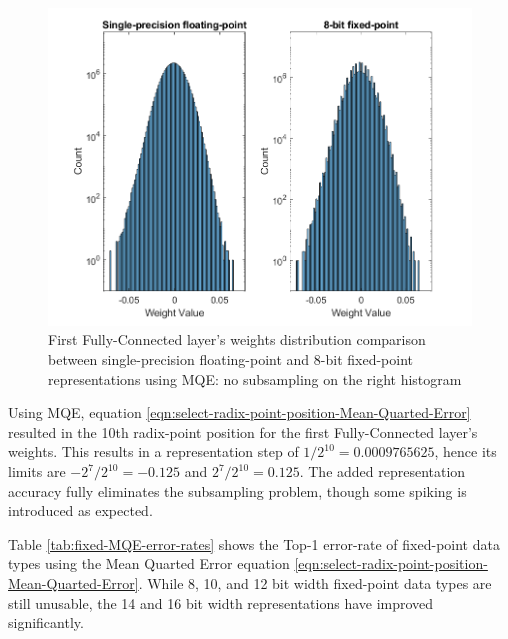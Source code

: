 \begin{figure} [H]
	\centering
	\includegraphics[scale=0.9]{Images/Weights-distributions/original-vs-fixed8/weight-distribution-FC1-MQE.png}
	\decoRule
	\caption[First Fully-Connected layer's weights distribution comparison between single-precision floating-point and 8-bit fixed-point representations using MQE]{First Fully-Connected layer's weights distribution comparison between single-precision floating-point and 8-bit fixed-point representations using MQE: no subsampling on the right histogram}
	\label{fig:weight-distribution-comparison-FC1-MQE}
\end{figure}

Using MQE, equation \ref{eqn:select-radix-point-position-Mean-Quarted-Error} resulted in the 10th radix-point position for the first Fully-Connected layer's weights. This results in a representation step of $1/2^10 = 0.0009765625$, hence its limits are $-2^7/2^10 = -0.125$ and $2^7/2^10 = 0.125$. The added representation accuracy fully eliminates the subsampling problem, though some spiking is introduced as expected.

Table \ref{tab:fixed-MQE-error-rates} shows the Top-1 error-rate of fixed-point data types using the Mean Quarted Error equation \ref{eqn:select-radix-point-position-Mean-Quarted-Error}. While 8, 10, and 12 bit width fixed-point data types are still unusable, the 14 and 16 bit width representations have improved significantly.

